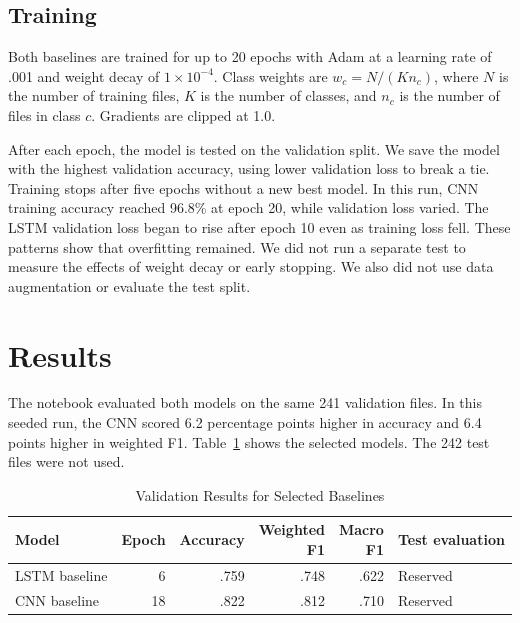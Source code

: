 \documentclass[stu, floatsintext]{apa7}
\begin{document}
\subsection{Training}
Both baselines are trained for up to 20 epochs with Adam \parencite{Kingma2015}
at a learning rate of .001 and weight decay of $1\times10^{-4}$. Class weights
are $w_c = N/(K n_c)$, where $N$ is the number of training files, $K$ is the
number of classes, and $n_c$ is the number of files in class $c$. Gradients are
clipped at 1.0.

After each epoch, the model is tested on the validation split. We save the model
with the highest validation accuracy, using lower validation loss to break a tie.
Training stops after five epochs without a new best model. In this run, CNN
training accuracy reached 96.8\% at epoch 20, while validation loss varied. The
LSTM validation loss began to rise after epoch 10 even as training loss fell.
These patterns show that overfitting remained. We did not run a separate test to
measure the effects of weight decay or early stopping. We also did not use data
augmentation or evaluate the test split.

\section{Results}
The notebook evaluated both models on the same 241 validation files. In this
seeded run, the CNN scored 6.2 percentage points higher in accuracy and 6.4
points higher in weighted F1. Table~\ref{tab:results} shows the selected models.
The 242 test files were not used.

\begin{table}[htbp]
  \centering
  \begin{threeparttable}
    \caption{Validation Results for Selected Baselines}
    \label{tab:results}
    \begin{tabular}{@{}lrrrrl@{}}
      \toprule
      Model & Epoch & Accuracy & \shortstack{Weighted\\F1} & \shortstack{Macro\\F1} & Test evaluation \\
      \midrule
      LSTM baseline & 6 & .759 & .748 & .622 & Reserved \\
      CNN baseline & 18 & .822 & .812 & .710 & Reserved \\
      \bottomrule
    \end{tabular}
  \end{threeparttable}
\end{table}
\end{document}
